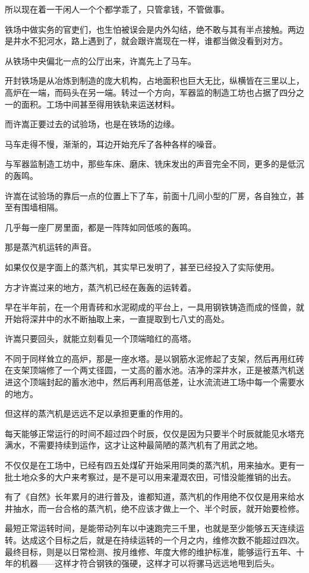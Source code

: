 所以现在着一干闲人一个个都学乖了，只管拿钱，不管做事。

铁场中做实务的官吏们，也生怕被误会是内外勾结，绝不敢与其有半点接触。两边是井水不犯河水，路上遇到了，就会跟许嵩现在一样，谁都当做没看到对方。

从铁场中央偏北一点的公厅出来，许嵩先上了马车。

开封铁场是从冶炼到制造的庞大机构，占地面积也巨大无比，纵横皆在三里以上，高炉在一端，而码头在另一端。转过一个方向，军器监的制造工坊也占据了四分之一的面积。工场中间甚至得用铁轨来运送材料。

而许嵩正要过去的试验场，也是在铁场的边缘。

马车走得不慢，渐渐的，耳边开始充斥了各种各样的噪音。

与军器监制造工坊中，那些车床、磨床、铣床发出的声音完全不同，更多的是低沉的轰鸣。

许嵩在试验场的靠后一点的位置上下了车，前面十几间小型的厂房，各自独立，甚至有围墙相隔。

几乎每一座厂房里面，都是一阵阵如同低咳的轰鸣。

那是蒸汽机运转的声音。

如果仅仅是字面上的蒸汽机，其实早已发明了，甚至已经投入了实际使用。

方才许嵩过来的地方，蒸汽机已经在轰轰的运转着。

早在半年前，在一个用青砖和水泥砌成的平台上，一具用钢铁铸造而成的怪兽，就开始将深井中的水不断抽取上来，一直提取到七八丈的高处。

许嵩只要回头，就能立刻看见一个顶端暗红的高塔。

不同于同样耸立的高炉，那是一座水塔。是以钢筋水泥修起了支架，然后再用红砖在支架顶端修了一个两丈径圆，一丈高的蓄水池。洁净的深井水，正是被蒸汽机送进这个顶端封起的蓄水池中，然后再利用高低差，让水流流进工场中每一个需要水的地方。

但这样的蒸汽机是远远不足以承担更重的作用的。

每天能够正常运行的时间不超过四个时辰，仅仅是因为只要半个时辰就能见水塔充满水，不需要持续到运作，这才让这种最简陋的蒸汽机有了用武之地。

不仅仅是在工场中，已经有四五处煤矿开始采用同类的蒸汽机，用来抽水。更有一批土地众多的大户来考察过，是不是可以用来灌溉农田，可惜没能推销的出去。

有了《自然》长年累月的进行普及，谁都知道，蒸汽机的作用绝不仅仅是用来给水井抽水，而一台合格的蒸汽机，绝不应该才做上一个、半个时辰，就开始要检修。

最短正常运转时间，是能带动列车以中速跑完三千里，也就是至少能够五天连续运转。达成这个目标之后，就是在持续运转的一个月之内，维修次数不能超过四次。最终目标，则是以日常检测、按月维修、年度大修的维护标准，能够运行五年、十年的机器——这样才符合钢铁的强硬，这样才可以将骡马远远地甩到后头。

